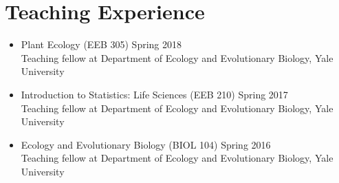 \documentclass[11pt,a4paper,sans]{moderncv}        %
\begin{document}
\section{Teaching Experience}

\begin{itemize}
\item Plant Ecology (EEB 305) \hfill Spring 2018\\ 
{\footnotesize Teaching fellow at Department of Ecology and Evolutionary Biology, Yale University}\\

\item  Introduction to Statistics: Life Sciences (EEB 210) \hfill Spring 2017\\ 
{\footnotesize Teaching fellow at Department of Ecology and Evolutionary Biology, Yale University}\\

\item Ecology and Evolutionary Biology (BIOL 104) \hfill Spring 2016\\ 
{\footnotesize Teaching fellow at Department of Ecology and Evolutionary Biology, Yale University}\\

\end{itemize}
\end{document}

